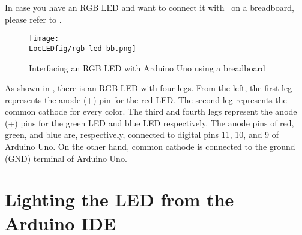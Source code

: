 In case you have an RGB LED and want to connect it with \arduino\ on a breadboard, 
please refer to . 
\begin{figure}
  \centering
  \texttt{[image: \\LocLEDfig/rgb-led-bb.png]}
  \caption{Interfacing an RGB LED with Arduino Uno using a breadboard}
  \label{fig:ard-rgb-bread}
\end{figure}
As shown in , there is an RGB LED with four legs. 
From the left, the first leg represents the anode (+) pin for the red LED. 
The second leg represents the common cathode for every color. 
The third and fourth legs represent the anode (+) pins for the green LED and blue LED respectively. 
The anode pins of red, green, and blue are, respectively, connected to digital pins 11, 10, and 9 of Arduino Uno. 
On the other hand, common cathode is connected to the ground (GND) terminal of Arduino Uno. 

\section{Lighting the LED from the Arduino IDE}

